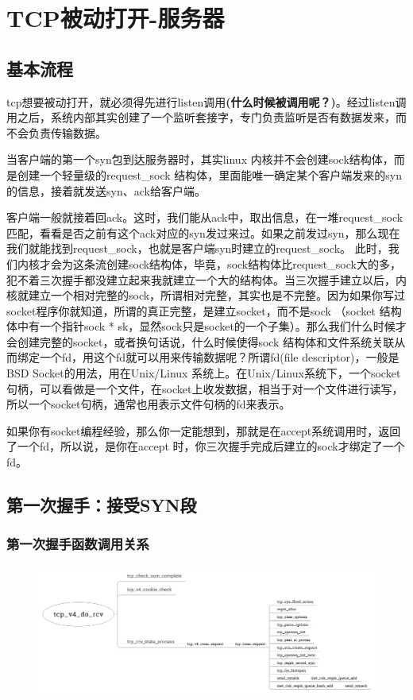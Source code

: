 \section{TCP被动打开-服务器}
        \subsection{基本流程}
            tcp想要被动打开，就必须得先进行listen调用\textbf{(什么时候被调用呢？)}。经过listen调用之后，系统内部其实创建了一个监听套接字，专门负责监听是否有数据发来，而不会负责传输数据。

            当客户端的第一个syn包到达服务器时，其实linux 内核并不会创建sock结构体，而是创建一个轻量级的request\_sock 结构体，里面能唯一确定某个客户端发来的syn的信息，接着就发送syn、ack给客户端。

            客户端一般就接着回ack。这时，我们能从ack中，取出信息，在一堆request\_sock匹配，看看是否之前有这个ack对应的syn发过来过。如果之前发过syn，那么现在我们就能找到request\_sock，也就是客户端syn时建立的request\_sock。 此时，我们内核才会为这条流创建sock结构体，毕竟，sock结构体比request\_sock大的多，犯不着三次握手都没建立起来我就建立一个大的结构体。当三次握手建立以后，内核就建立一个相对完整的sock，所谓相对完整，其实也是不完整。因为如果你写过socket程序你就知道，所谓的真正完整，是建立socket，而不是sock （socket 结构体中有一个指针sock * sk，显然sock只是socket的一个子集）。那么我们什么时候才会创建完整的socket，或者换句话说，什么时候使得sock 结构体和文件系统关联从而绑定一个fd，用这个fd就可以用来传输数据呢？所谓fd(file descriptor)，一般是BSD Socket的用法，用在Unix/Linux 系统上。在Unix/Linux系统下，一个socket句柄，可以看做是一个文件，在socket上收发数据，相当于对一个文件进行读写，所以一个socket句柄，通常也用表示文件句柄的fd来表示。

            如果你有socket编程经验，那么你一定能想到，那就是在accept系统调用时，返回了一个fd，所以说，是你在accept 时，你三次握手完成后建立的sock才绑定了一个 fd。
        \subsection{第一次握手：接受SYN段}
            \subsubsection{第一次握手函数调用关系}
                \begin{figure}[htb]        
                    \centering
                    \includegraphics[width=\textwidth]  {images/The First Shake Hand of Server.png}
                \end{figure}       
